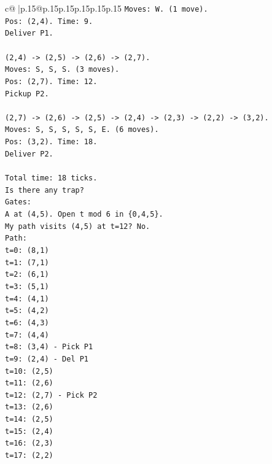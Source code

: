 \documentclass{article}
\begin{document}
{\begin{supertabular}{c@{$\;$}|p{.15\linewidth}@{}p{.15\linewidth}p{.15\linewidth}p{.15\linewidth}p{.15\linewidth}p{.15\linewidth}}
{{{\texttt{Moves: W. (1 move).} \\
\texttt{Pos: (2,4). Time: 9.} \\
\texttt{Deliver P1.} \\
\\ 
\texttt{(2,4) {-}> (2,5) {-}> (2,6) {-}> (2,7).} \\
\texttt{Moves: S, S, S. (3 moves).} \\
\texttt{Pos: (2,7). Time: 12.} \\
\texttt{Pickup P2.} \\
\\ 
\texttt{(2,7) {-}> (2,6) {-}> (2,5) {-}> (2,4) {-}> (2,3) {-}> (2,2) {-}> (3,2).} \\
\texttt{Moves: S, S, S, S, S, E. (6 moves).} \\
\texttt{Pos: (3,2). Time: 18.} \\
\texttt{Deliver P2.} \\
\\ 
\texttt{Total time: 18 ticks.} \\
\texttt{Is there any trap?} \\
\texttt{Gates:} \\
\texttt{A at (4,5). Open t mod 6 in \{0,4,5\}.} \\
\texttt{My path visits (4,5) at t=12? No.} \\
\texttt{Path:} \\
\texttt{t=0: (8,1)} \\
\texttt{t=1: (7,1)} \\
\texttt{t=2: (6,1)} \\
\texttt{t=3: (5,1)} \\
\texttt{t=4: (4,1)} \\
\texttt{t=5: (4,2)} \\
\texttt{t=6: (4,3)} \\
\texttt{t=7: (4,4)} \\
\texttt{t=8: (3,4) {-} Pick P1} \\
\texttt{t=9: (2,4) {-} Del P1} \\
\texttt{t=10: (2,5)} \\
\texttt{t=11: (2,6)} \\
\texttt{t=12: (2,7) {-} Pick P2} \\
\texttt{t=13: (2,6)} \\
\texttt{t=14: (2,5)} \\
\texttt{t=15: (2,4)} \\
\texttt{t=16: (2,3)} \\
\texttt{t=17: (2,2)} \\
}}}
\end{supertabular}}
\end{document}

